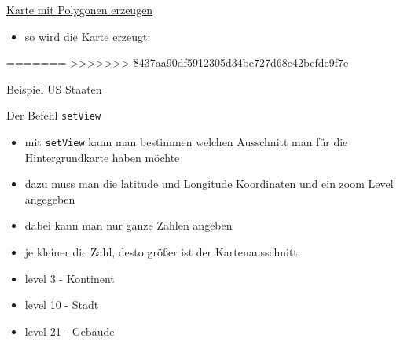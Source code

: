 \documentclass[ignorenonframetext,]{beamer}
\newenvironment{Shaded}{}{}
\newcommand{\KeywordTok}[1]{\textcolor[rgb]{0.00,0.44,0.13}{\textbf{{#1}}}}
\newcommand{\DataTypeTok}[1]{\textcolor[rgb]{0.56,0.13,0.00}{{#1}}}
\newcommand{\DecValTok}[1]{\textcolor[rgb]{0.25,0.63,0.44}{{#1}}}
\newcommand{\StringTok}[1]{\textcolor[rgb]{0.25,0.44,0.63}{{#1}}}
\newcommand{\OtherTok}[1]{\textcolor[rgb]{0.00,0.44,0.13}{{#1}}}
\newcommand{\NormalTok}[1]{{#1}}
\providecommand{\tightlist}{%
\setlength{\itemsep}{0pt}\setlength{\parskip}{0pt}}
\begin{document}
\begin{frame}[fragile]{\href{https://rstudio.github.io/leaflet/map_widget.html}{Karte
mit Polygonen erzeugen}}
\begin{itemize}
\tightlist
\item
  so wird die Karte erzeugt:
\end{itemize}

\begin{Shaded}
\end{Shaded}

=======
\textgreater{}\textgreater{}\textgreater{}\textgreater{}\textgreater{}\textgreater{}\textgreater{}
8437aa90df5912305d34be727d68e42bcfde9f7e

\end{frame}

\begin{frame}[fragile]{Beispiel US Staaten}

\begin{Shaded}
\end{Shaded}

\end{frame}

\begin{frame}[fragile]{Der Befehl \texttt{setView}}

\begin{itemize}
\item
  mit \texttt{setView} kann man bestimmen welchen Ausschnitt man für die
  Hintergrundkarte haben möchte
\item
  dazu muss man die latitude und Longitude Koordinaten und ein zoom
  Level angegeben
\item
  dabei kann man nur ganze Zahlen angeben
\item
  je kleiner die Zahl, desto größer ist der Kartenausschnitt:
\item
  level 3 - Kontinent
\item
  level 10 - Stadt
\item
  level 21 - Gebäude
\end{itemize}

\end{frame}
\end{document}
